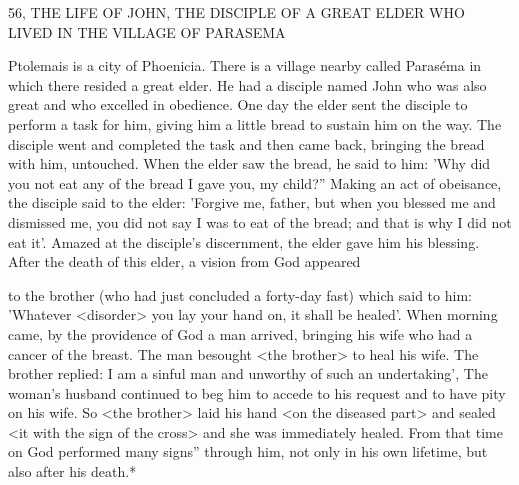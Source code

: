 56, THE LIFE OF JOHN, THE DISCIPLE
OF A GREAT ELDER WHO LIVED IN
THE VILLAGE OF PARASEMA

Ptolemais is a city of Phoenicia. There is a village nearby called
Paraséma in which there resided a great elder. He had a disciple
named John who was also great and who excelled in obedience. One
day the elder sent the disciple to perform a task for him, giving him
a little bread to sustain him on the way. The disciple went and
completed the task and then came back, bringing the bread with
him, untouched. When the elder saw the bread, he said to him:
'Why did you not eat any of the bread I gave you, my child?”
Making an act of obeisance, the disciple said to the elder: 'Forgive
me, father, but when you blessed me and dismissed me, you did not
say I was to eat of the bread; and that is why I did not eat it'.
Amazed at the disciple's discernment, the elder gave him his
blessing. After the death of this elder, a vision from God appeared

to the brother (who had just concluded a forty-day fast) which said
to him: 'Whatever <disorder> you lay your hand on, it shall be
healed'. When morning came, by the providence of God a man
arrived, bringing his wife who had a cancer of the breast. The man
besought <the brother> to heal his wife. The brother replied: I am
a sinful man and unworthy of such an undertaking', The woman's
husband continued to beg him to accede to his request and to have
pity on his wife. So <the brother> laid his hand <on the diseased
part> and sealed <it with the sign of the cross> and she was
immediately healed. From that time on God performed many signs”
through him, not only in his own lifetime, but also after his death.*

